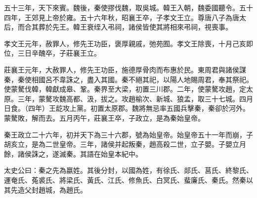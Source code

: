 \begin{pinyinscope}
五十三年，天下來賓。魏後，秦使摎伐魏，取吳城。韓王入朝，魏委國聽令。五十四年，王郊見上帝於雍。五十六年秋，昭襄王卒，子孝文王立。尊唐八子為唐太后，而合其葬於先王。韓王衰绖入弔祠，諸侯皆使其將相來弔祠，視喪事。

孝文王元年，赦罪人，修先王功臣，褒厚親戚，弛苑囿。孝文王除喪，十月己亥即位，三日辛醜卒，子莊襄王立。

莊襄王元年，大赦罪人，修先王功臣，施德厚骨肉而布惠於民。東周君與諸侯謀秦，秦使相國呂不韋誅之，盡入其國。秦不絕其祀，以陽人地賜周君，奉其祭祀。使蒙驁伐韓，韓獻成皋、鞏。秦界至大梁，初置三川郡。二年，使蒙驁攻趙，定太原。三年，蒙驁攻魏高都、汲，拔之。攻趙榆次、新城、狼孟，取三十七城。四月日食。（四年）王龁攻上黨。初置太原郡。魏將無忌率五國兵擊秦，秦卻於河外。蒙驁敗，解而去。五月丙午，莊襄王卒，子政立，是為秦始皇帝。

秦王政立二十六年，初并天下為三十六郡，號為始皇帝。始皇帝五十一年而崩，子胡亥立，是為二世皇帝。三年，諸侯并起叛秦，趙高殺二世，立子嬰。子嬰立月餘，諸侯誅之，遂滅秦。其語在始皇本紀中。

太史公曰：秦之先為嬴姓。其後分封，以國為姓，有徐氏、郯氏、莒氏、終黎氏、運奄氏、菟裘氏、將梁氏、黃氏、江氏、修魚氏、白冥氏、蜚廉氏、秦氏。然秦以其先造父封趙城，為趙氏。


\end{pinyinscope}
